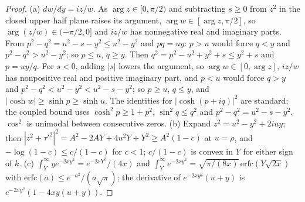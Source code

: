 \begin{proof}
(a) $dw/dy=iz/w$. As $\arg z\in[0,\pi/2)$ and subtracting $s\ge0$ from $z^2$ in the closed upper half plane raises
its argument, $\arg w\in[\arg z,\pi/2]$, so $\arg(z/w)\in(-\pi/2,0]$ and $iz/w$ has nonnegative real and imaginary
parts. From $p^2-q^2=u^2-s-y^2\le u^2-y^2$ and $pq=uy$: $p>u$ would force $q<y$ and $p^2-q^2>u^2-y^2$; so $p\le u$,
$q\ge y$. Then $q^2=p^2-u^2+y^2+s\le y^2+s$ and $p=uy/q$. For $s<0$, adding $|s|$ lowers the argument, so
$\arg w\in[0,\arg z]$, $iz/w$ has nonpositive real and positive imaginary part, and $p<u$ would force $q>y$ and
$p^2-q^2<u^2-y^2<u^2-s-y^2$; so $p\ge u$, $q\le y$, and $|\cosh w|\ge\sinh p\ge\sinh u$. The identities for $|\cosh(p+iq)|^2$ are standard; the
coupled bound uses $\cosh^2p\ge1+p^2$, $\sin^2q\le q^2$ and $p^2-q^2=u^2-s-y^2$. $\cos^2$ is unimodal between
consecutive zeros. (b) Expand $z^2=u^2-y^2+2iuy$; then $|z^2+\tau'^2|^2=A^2-2AY+4u^2Y+Y^2\ge A^2(1-c)$ at
$u=\rho$, and $-\log(1-c)\le c/(1-c)$ for $c<1$; $c/(1-c)$ is convex in $Y$ for either sign of $k$. (c) $\int_Y^\infty ye^{-2xy^2}=e^{-2xY^2}/(4x)$ and
$\int_Y^\infty e^{-2xy^2}=\sqrt{\pi/(8x)}\,\mathrm{erfc}(Y\sqrt{2x})$ with $\mathrm{erfc}(a)\le
e^{-a^2}/(a\sqrt\pi)$; the derivative of $e^{-2xy^2}(u+y)$ is $e^{-2xy^2}(1-4xy(u+y))$.
\end{proof}

